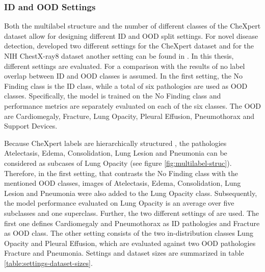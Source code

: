 \subsubsection{ID and OOD Settings}
Both the multilabel structure and the number of different classes of the CheXpert dataset allow for designing different ID and OOD split settings.
For novel disease detection, \citep{Berger2021} developed two different settings for the CheXpert dataset and for the NIH ChestX-ray8 dataset \citep{Wang2017} another setting can be found in \citep{Cao2020}.
In this thesis, different settings are evaluated.
For a comparison with the results of \citep{Berger2021} no label overlap between ID and OOD classes is assumed.
In the first setting, the No Finding class is the ID class, while a total of six pathologies are used as OOD classes.
Specifically, the model is trained on the No Finding class and performance metrics are separately evaluated on each of the six classes.
The OOD are Cardiomegaly, Fracture, Lung Opacity, Pleural Effusion, Pneumothorax and Support Devices.
\par
Because CheXpert labels are hierarchically structured \cite{Irvin2019}, the pathologies Atelectasis, Edema, Consolidation, Lung Lesion and Pneumonia can be considered as subcases of Lung Opacity (see figure \ref{fig:multilabel-struc}).
Therefore, in the first setting, that contrasts the No Finding class with the mentioned OOD classes, images of Atelectasis, Edema, Consolidation, Lung Lesion and Pneumonia were also added to the Lung Opacity class.
Subsequently, the model performance evaluated on Lung Opacity is an average over five subclasses and one superclass.
Further, the two different settings of \citep{Berger2021} are used.
The first one defines Cardiomegaly and Pneumothorax as ID pathologies and Fracture as OOD class.
The other setting consists of the two in-distribution classes Lung Opacity and Pleural Effusion, which are evaluated against two OOD pathologies Fracture and Pneumonia.
Settings and dataset sizes are summarized in table \ref{table:settings-dataset-sizes}.
